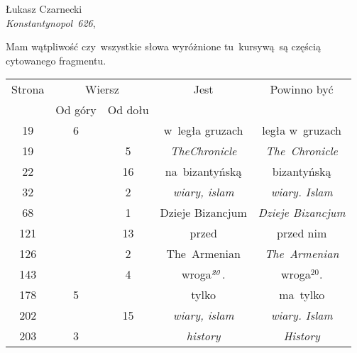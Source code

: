 \documentclass[a4paper,11pt]{article}
\begin{document}
{ %
  Łukasz Czarnecki \\
  \textit{Konstantynopol~626}, \cite{} %
}

\vspace{0em}




\noindent
{} Mam wątpliwość czy~wszystkie słowa wyróżnione
tu~kursywą~są częścią cytowanego fragmentu.

\VerSpaceFour







\begin{center}

  \begin{tabular}{|c|c|c|c|c|}
    \hline
    Strona & \multicolumn{2}{c|}{Wiersz} & Jest
                              & Powinno być \\ \cline{2-3}
    & Od góry & Od dołu & & \\
    \hline
    \hphantom{0}19 & \hphantom{0}6 & & w~legła gruzach & legła w~gruzach \\
    \hphantom{0}19 & & \hphantom{0}5 & \textit{TheChronicle}
    & \textit{The~Chronicle} \\
    \hphantom{0}22 & & 16 & na~bizantyńską & bizantyńską \\
    \hphantom{0}32 & & \hphantom{0}2 & \textit{wiary, islam}
    & \textit{wiary. Islam} \\
    \hphantom{0}68 & & \hphantom{0}1 & Dzieje Bizancjum
    & \textit{Dzieje Bizancjum} \\
    121 & & 13 & przed & przed nim \\
    126 & & \hphantom{0}2 & The~Armenian & \textit{The~Armenian} \\
    143 & & \hphantom{0}4 & wroga$^{ \textrm{\textit{20}} }$.
    & wroga$^{ 20 }$. \\
    178 & \hphantom{0}5 & & tylko & ma~tylko \\
    202 & & 15 & \textit{wiary, islam} & \textit{wiary. Islam} \\
    203 & \hphantom{0}3 & & \textit{history} & \textit{History} \\
    \hline
  \end{tabular}

\end{center}
\end{document}
